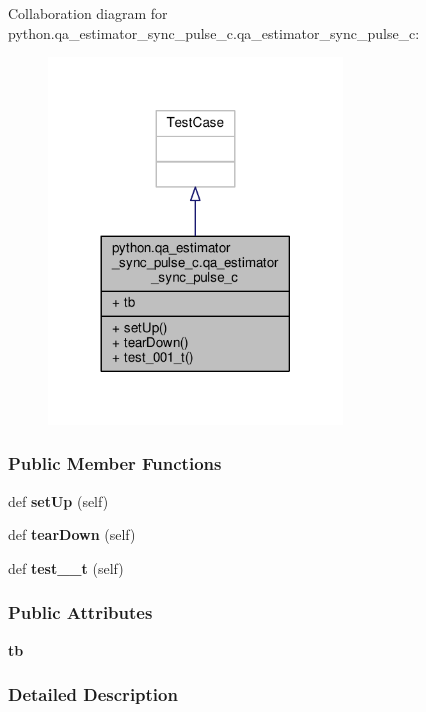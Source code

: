 Collaboration diagram for python.\+qa\+\_\+estimator\+\_\+sync\+\_\+pulse\+\_\+c.\+qa\+\_\+estimator\+\_\+sync\+\_\+pulse\+\_\+c\+:
\nopagebreak
\begin{figure}[H]
\begin{center}
\leavevmode
\includegraphics[width=221pt]{de/dff/classpython_1_1qa__estimator__sync__pulse__c_1_1qa__estimator__sync__pulse__c__coll__graph}
\end{center}
\end{figure}
\subsubsection*{Public Member Functions}
\begin{DoxyCompactItemize}
\item 
def {\bf set\+Up} (self)
\item 
def {\bf tear\+Down} (self)
\item 
def {\bf test\+\_\+\_\+t} (self)
\end{DoxyCompactItemize}
\subsubsection*{Public Attributes}
\begin{DoxyCompactItemize}
\item 
{\bf tb}
\end{DoxyCompactItemize}


\subsubsection{Detailed Description}


